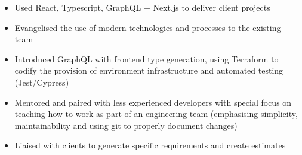 \bigbreak
\begin{itemize}
    \item Used React, Typescript, GraphQL + Next.js to deliver client projects
    \item Evangelised the use of modern technologies and processes to the existing team
    \item Introduced GraphQL with frontend type generation, using Terraform to codify the provision of environment infrastructure and automated testing (Jest/Cypress)
    \item Mentored and paired with less experienced developers with special focus on teaching how to work as part of an engineering team (emphasising simplicity, maintainability and using git to properly document changes)
    \item Liaised with clients to generate specific requirements and create estimates
\end{itemize}
